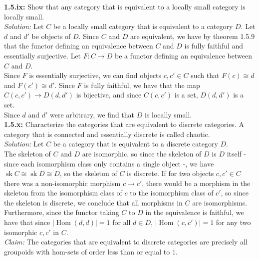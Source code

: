 \documentclass[a4paper]{article}
\DeclareMathOperator{\sk}{sk}
\DeclareMathOperator{\Hom}{Hom}
\begin{document}
    \textbf{1.5.ix:} Show that any category that is equivalent to a locally
    small category is locally small.\\
    \linebreak
    \textit{Solution:} Let $C$ be a locally small category that is equivalent
    to a category $D$. Let
    $d$ and $d'$ be objects of $D$. Since $C$ and $D$ are equivalent, we have
    by theorem 1.5.9 that
    the functor defining an equivalence between $C$ and $D$ is fully faithful
    and
    essentially surjective. Let $F  \colon C \to D$ be a functor defining
    an equivalence between $C$ and $D$.\\
    Since $F$ is essentially surjective, we can find objects
    $c, c' \in C$ such that $F(c) \cong d$ and $F(c') \cong d'$. Since
    $F$ is fully faithful, we have
    that the map $C\left( c,c' \right) \to D\left( d,d' \right) $ is
    bijective, and since $C\left( c,c' \right) $ is a set, $D(d,d')$ is
    a set.\\
    Since $d$ and $d'$ were arbitrary, we find that $D$ is locally small.\\
    \linebreak
    \textbf{1.5.x:} Characterize the categories that are equivalent to discrete
    categories. A category that is connected and essentially discrete is called
    chaotic.\\
    \linebreak
    \textit{Solution:} Let $C$ be a category that is equivalent to a discrete category $D$.\\
    The skeleton of $C$ and $D$ are isomorphic, so since the skeleton of $D$ is
    $D$ itself - since each isomorphism class only contains a single object -,
    we have $\sk C \cong \sk D \cong D$, so the skeleton of $C$ is discrete.
    If for two objects $c, c' \in C$ there was a non-isomorphic morphism
    $c \to c'$, there would be a morphism in the skeleton from the isomorphism
    class of $c$ to the isomorphism class of $c'$, so since the skeleton is
    discrete, we conclude that all morphisms in $C$ are isomorphisms.\\
    Furthermore, since the functor taking $C$ to $D$ in the equivalence is
    faithful, we have that since $\left| \Hom (d,d) \right| = 1$ for all $d \in
    D$, $\left| \Hom (c,c') \right| = 1$ for any two isomorphic $c,c'$ in
    $C$.\\
    \linebreak
    \textit{Claim:} The categories that are equivalent to discrete categories
    are precisely all groupoids with hom-sets of order less than or equal to $1$.\\
\end{document}
